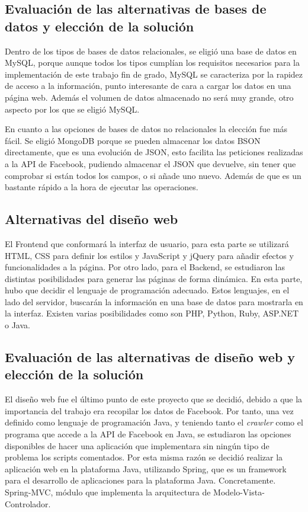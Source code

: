 \subsection{Evaluación de las alternativas de bases de datos y elección de la solución}
Dentro de los tipos de bases de datos relacionales, se eligió una base de datos en MySQL, porque aunque todos los tipos cumplían los requisitos necesarios para la implementación de este trabajo fin de grado, MySQL se caracteriza por la rapidez de acceso a la información, punto interesante de cara a cargar los datos en una página web. Además el volumen de datos almacenado no será muy grande, otro aspecto por los que se eligió MySQL. 

En cuanto a las opciones de bases de datos no relacionales la elección fue más fácil. Se eligió MongoDB porque se pueden almacenar los datos BSON directamente, que es una evolución de JSON, esto facilita las peticiones realizadas a la API de Facebook, pudiendo almacenar el JSON que devuelve, sin tener que comprobar si están todos los campos, o si añade uno nuevo. Además de que es un bastante rápido a la hora de ejecutar las operaciones.
\subsection{Alternativas del diseño web}
El Frontend que conformará la interfaz de usuario, para esta parte se utilizará HTML, CSS para definir los estilos y JavaScript y jQuery para añadir efectos y funcionalidades a la página. 
Por otro lado, para el Backend, se estudiaron las distintas posibilidades para generar las páginas de forma dinámica. En esta parte, hubo que decidir el lenguaje de programación adecuado. Estos lenguajes, en el lado del servidor, buscarán la información en una base de datos para mostrarla en la interfaz. Existen varias posibilidades como son PHP, Python, Ruby, ASP.NET o Java.
\subsection{Evaluación de las alternativas de diseño web y elección de la solución} \label{sec:3.3.6}
El diseño web fue el último punto de este proyecto que se decidió, debido a que la importancia del trabajo era recopilar los datos de Facebook. Por tanto, una vez definido como lenguaje de programación Java, y teniendo tanto el \textit{crawler} como el programa que accede a la API de Facebook en Java, se estudiaron las opciones disponibles de hacer una aplicación que implementara sin ningún tipo de problema los scripts comentados. Por esta misma razón se decidió realizar la aplicación web en la plataforma Java, utilizando Spring, que es un framework para el desarrollo de aplicaciones para la plataforma Java. Concretamente. Spring-MVC, módulo que implementa la arquitectura de Modelo-Vista-Controlador.

